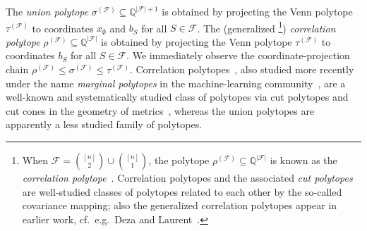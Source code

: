 \documentclass[11pt]{article}
\newcommand{\vp}{\ensuremath{\tau}}
\newcommand{\up}{\ensuremath{\sigma}}
\newcommand{\cp}{\ensuremath{\rho}}
\begin{document}
The {\em union polytope} 
$\up^{(\mathcal{F})}\subseteq\mathbb{Q}^{|\mathcal{F}|+1}$ 
is obtained by projecting the Venn polytope $\vp^{(\mathcal{F})}$ 
to coordinates $x_\emptyset$ and $b_S$ for all $S\in\mathcal{F}$. 
The (generalized%
\footnote{When $\mathcal{F}=\binom{[n]}{2}\cup \binom{[n]}{1}$, the 
polytope $\cp^{(\mathcal{F})}\subseteq\mathbb{Q}^{|\mathcal{F}|}$ is known
as the {\em correlation polytope}~\cite{Pitowsky1991}. 
Correlation polytopes and the associated
{\em cut polytopes} are well-studied classes of polytopes related to each
other by the so-called covariance mapping; also the generalized 
correlation polytopes appear in earlier work, 
cf.~e.g.~Deza and Laurent~\cite[Chap.~I.5]{DezaL1997}.}) 
{\em correlation polytope} 
$\cp^{(\mathcal{F})}\subseteq\mathbb{Q}^{|\mathcal{F}|}$
is obtained by projecting the Venn polytope $\vp^{(\mathcal{F})}$ 
to coordinates $b_S$ for all $S\in\mathcal{F}$. 
We immediately observe the coordinate-projection chain 
$\cp^{(\mathcal{F})}\leq\up^{(\mathcal{F})}\leq\vp^{(\mathcal{F})}$.
Correlation polytopes~\cite{Pitowsky1991}, also studied more recently 
under the name {\em marginal polytopes} in the machine-learning 
community~\cite{WainwrightJ2008}, are a well-known and systematically 
studied class of polytopes via cut polytopes and cut cones in the
geometry of metrics~\cite{DezaL1997}, 
whereas the union polytopes are apparently a less studied family of 
polytopes.
\end{document}
